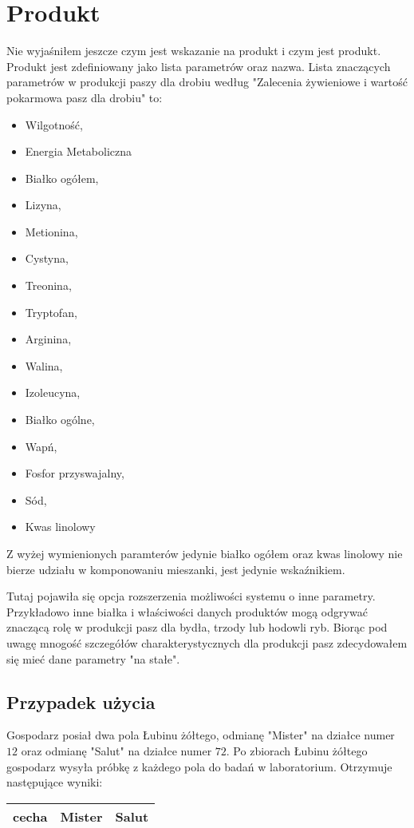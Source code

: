 \documentclass[shortabstract]{iithesis}
\begin{document}
\section{Produkt}
Nie wyjaśniłem jeszcze czym jest wskazanie na produkt i czym jest produkt. Produkt jest zdefiniowany jako lista parametrów oraz nazwa.
Lista znaczących parametrów w produkcji paszy dla drobiu według "Zalecenia żywieniowe i wartość pokarmowa pasz dla drobiu" to:
\begin{itemize}
	\item 	Wilgotność,
	\item	Energia Metaboliczna
	\item 	Białko ogółem,
	\item	Lizyna, 
	\item	Metionina,
	\item 	Cystyna, 
	\item	Treonina, 
	\item	Tryptofan, 
	\item	Arginina, 
	\item	Walina, 
	\item	Izoleucyna, 
	\item	Białko ogólne, 
	\item	Wapń, 
    	\item 	Fosfor przyswajalny, 
    	\item	Sód,
    	\item	Kwas linolowy 
\end{itemize}

Z wyżej wymienionych paramterów jedynie białko ogółem oraz kwas linolowy nie bierze udziału w komponowaniu mieszanki, jest jedynie wskaźnikiem.

Tutaj pojawiła się opcja rozszerzenia możliwości systemu o inne parametry. Przykładowo inne białka i właściwości danych produktów mogą odgrywać znaczącą rolę w produkcji pasz dla bydła, trzody lub hodowli ryb. Biorąc pod uwagę mnogość szczegółów charakterystycznych dla produkcji pasz zdecydowałem się mieć dane parametry "na stałe".

\subsection{Przypadek użycia}
Gospodarz posiał dwa pola Łubinu żółtego, odmianę "Mister" na działce numer $12$ oraz odmianę "Salut" na działce numer $72$. Po zbiorach Łubinu żółtego gospodarz wysyła próbkę z każdego pola do badań w laboratorium. Otrzymuje następujące wyniki:

\begin{tabular}{|c|c|c|}
\hline
cecha &Mister &Salut \\
\hline
\end{tabular}
\end{document}
